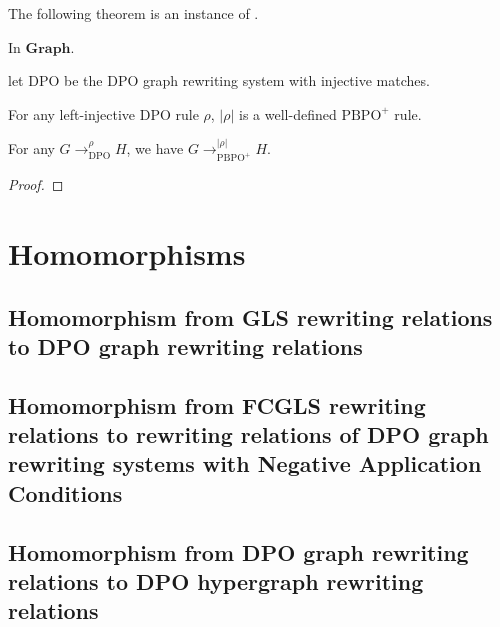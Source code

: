 \documentclass{book}
\begin{document}
        The following theorem is an instance of \cite[Theorem 72]{overbeek2023pbpo_JLAMP}.
        \begin{theorem}
            In $\mathbf{Graph}$.
            
            let $\mathrm{DPO}$ be the DPO graph rewriting system with injective matches.
        
            For any left-injective DPO rule $\rho$, $|\rho|$ is a well-defined $\mathrm{PBPO}^+$ rule. 
            
            For any $G \mathop{\to} ^{\rho}_{\mathrm{DPO}} H$, we have $G \mathop{\to} ^{|\rho|}_{\mathrm{PBPO}^+} H$.  
        \end{theorem}
        \begin{proof}
        \end{proof}
        
\chapter{Homomorphisms}

    \section{Homomorphism from GLS rewriting relations to DPO graph rewriting relations}
    \label{sec:morphism_from_gls_to_dpo_grs}
    
    \section{Homomorphism from FCGLS rewriting relations to rewriting relations of DPO graph rewriting systems with Negative Application Conditions}
    \label{sec:morphism_from_pgls_to_nac_dpo_grs}
    
    \section{Homomorphism from DPO graph rewriting relations to DPO hypergraph rewriting relations}
    \label{sec:morphism_from_dpo_grs_to_hypergraph}
    
\end{document}
